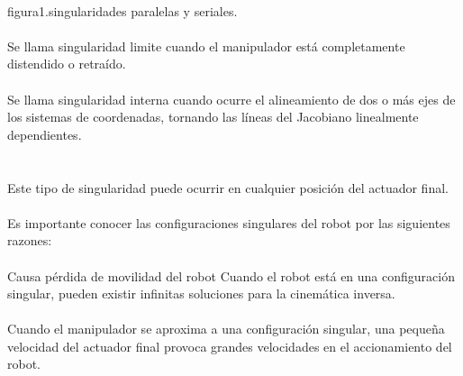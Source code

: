 \documentclass[12pt,a4paper]{article}
\begin{document}
\\
figura1.singularidades paralelas y seriales.
\\\\
Se llama singularidad limite cuando el manipulador está completamente distendido o retraído. 
\\\\
Se llama singularidad interna cuando ocurre el alineamiento de dos o más ejes de los sistemas de coordenadas, tornando las líneas del Jacobiano linealmente dependientes.
\\\\\\
Este tipo de singularidad puede ocurrir en cualquier posición del actuador final. 
\\\\
Es importante conocer las configuraciones singulares del robot por las siguientes razones: 
\\\\
Causa pérdida de movilidad del robot Cuando el robot está en una configuración singular, pueden existir infinitas soluciones para la cinemática inversa.
\\\\
Cuando el manipulador se aproxima a una configuración singular, una pequeña velocidad del actuador final provoca grandes velocidades en el accionamiento del robot.
\end{document}
